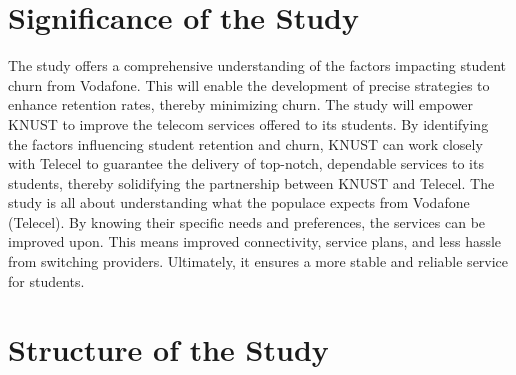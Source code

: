 \documentclass[doublespacing]{report} %
\begin{document}

\section{Significance of the Study}

The study offers a comprehensive understanding of the factors impacting student churn from Vodafone. This will enable the development of precise strategies to enhance retention rates, thereby minimizing churn. The study will empower KNUST to improve the telecom services offered to its students. By identifying the factors influencing student retention and churn, KNUST can work closely with Telecel to guarantee the delivery of top-notch, dependable services to its students, thereby solidifying the partnership between KNUST and Telecel. The study is all about understanding what the populace expects from Vodafone (Telecel). By knowing their specific needs and preferences, the services can be improved upon. This means improved connectivity, service plans, and less hassle from switching providers. Ultimately, it ensures a more stable and reliable service for students.

\section{Structure of the Study}
\end{document}
